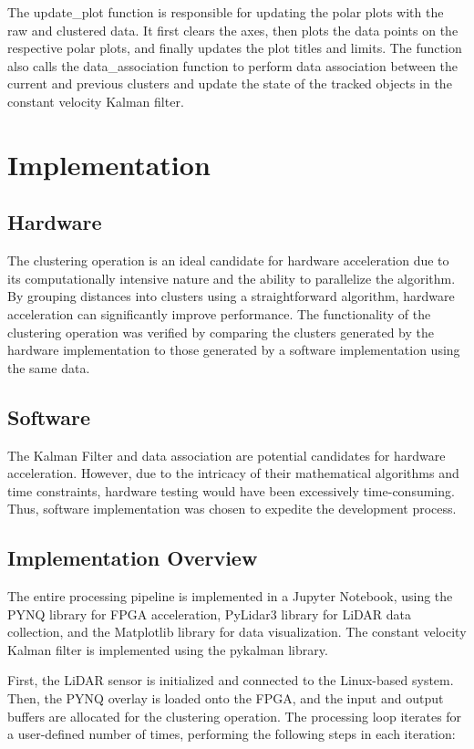 \documentclass[journal]{IEEEtran} %
\begin{document}
The update\_plot function is responsible for updating the polar plots with the raw and clustered data. It first clears the axes, then plots the data points on the respective polar plots, and finally updates the plot titles and limits. The function also calls the data\_association function to perform data association between the current and previous clusters and update the state of the tracked objects in the constant velocity Kalman filter.

\section{Implementation}

\subsection{Hardware}
The clustering operation is an ideal candidate for hardware acceleration due to its computationally intensive nature and the ability to parallelize the algorithm. By grouping distances into clusters using a straightforward algorithm, hardware acceleration can significantly improve performance. The functionality of the clustering operation was verified by comparing the clusters generated by the hardware implementation to those generated by a software implementation using the same data.

\subsection{Software}
The Kalman Filter and data association are potential candidates for hardware acceleration. However, due to the intricacy of their mathematical algorithms and time constraints, hardware testing would have been excessively time-consuming. Thus, software implementation was chosen to expedite the development process.

\subsection{Implementation Overview}

The entire processing pipeline is implemented in a Jupyter Notebook, using the PYNQ library for FPGA acceleration, PyLidar3 library for LiDAR data collection, and the Matplotlib library for data visualization. The constant velocity Kalman filter is implemented using the pykalman library.

First, the LiDAR sensor is initialized and connected to the Linux-based system. Then, the PYNQ overlay is loaded onto the FPGA, and the input and output buffers are allocated for the clustering operation. The processing loop iterates for a user-defined number of times, performing the following steps in each iteration:
\end{document}

